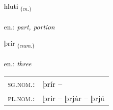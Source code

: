 \documentclass[frontgrid, backgrid]{flacards}\usepackage[]{graphicx}\usepackage[]{xcolor}
\begin{document}
\renewcommand{\flhead}{\vskip5pt \fboxsep=0pt {\small\bfseries\footnotesize Nafnorð | Noun}}
\renewcommand{\fcfoot}{\vskip5pt \fboxsep=0pt \hspace{2pt}{\small\bfseries\footnotesize 1K}}

\renewcommand{\blhead}{\vskip5pt {\small\bfseries\footnotesize Nafnorð | Noun }}
\renewcommand{\bcfoot}{\vskip5pt \hspace{2pt}{\small\bfseries\footnotesize 1K}}


{hluti \small{\textsubscript{(\textit{m.})}} \\[1ex] %
\textphonetic{[l̥ʏːtɪ]} \\
en.: \emph{part, portion} \\  [2ex]
\renewcommand*{\arraystretch}{0.8}
}

\renewcommand{\flhead}{\vskip5pt \fboxsep=0pt {\small\bfseries\footnotesize Töluorð | Numeral}}
\renewcommand{\fcfoot}{\vskip5pt \fboxsep=0pt \hspace{2pt}{\small\bfseries\footnotesize 1K}}

\renewcommand{\blhead}{\vskip5pt {\small\bfseries\footnotesize Töluorð | Numeral }}
\renewcommand{\bcfoot}{\vskip5pt \hspace{2pt}{\small\bfseries\footnotesize 1K}}


{þrír \small{\textsubscript{(\textit{num.})}} \\[1ex] %
\textphonetic{[θriːr]} \\
en.: \emph{three} \\  [2ex]
\renewcommand*{\arraystretch}{0.8}
\begin{tabular}{ll}
\textsc{sg.nom.}: & þrír  -- \\ 
\textsc{pl.nom.}: & þrír -- þrjár -- þrjú
\end{tabular}
}
\end{document}
